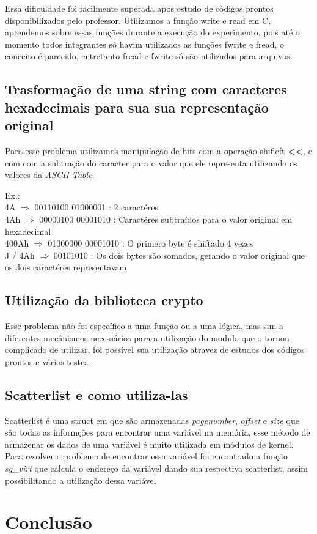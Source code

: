 Essa dificuldade foi facilmente superada após estudo de códigos prontos disponibilizados pelo professor.
Utilizamos a função write e read em C, aprendemos sobre essas funções durante a execução do experimento, pois até o momento todos integrantes só havim utilizados as funções fwrite e fread, o conceito é parecido, entretanto fread e fwrite só são utilizados para arquivos.

\subsection{Trasformação de uma string com caracteres hexadecimais para sua sua representação original}

Para esse problema utilizamos manipulação de bits com a operação shifleft \textbf{\textless\textless}, e com com a subtração do caracter para o valor que ele representa utilizando os valores da \textit{ASCII Table}.
\begin{flushleft}
\begin{em}
Ex.:\\
4A      $\Rightarrow$ 00110100 01000001 : 2 caractéres\\
4Ah     $\Rightarrow$ 00000100 00001010 : Caractéres subtraídos para o valor original em hexadecimal\\
400Ah   $\Rightarrow$ 01000000 00001010 : O primero byte é shiftado 4 vezes\\
J / 4Ah $\Rightarrow$ 00101010          : Os dois bytes são somados, gerando o valor original que os dois caractéres representavam \\ 
\end{em}
\end{flushleft}

\subsection{Utilização da biblioteca crypto}
Esse problema não foi específico a uma função ou a uma lógica, mas sim a diferentes mecânismos necessários para a utilização do modulo que o tornou complicado de utilizar, foi possível sua utilização atravez de estudos dos códigos prontos e vários testes. 

\subsection{Scatterlist e como utiliza-las}
Scatterlist é uma struct em que são armazenadas \textit{pagenumber}, \textit{offset} e \textit{size} que são todas as informções para encontrar uma variável na memória, esse método de armazenar os dados de uma variável é muito utilizada em módulos de kernel.\\
Para resolver o problema de encontrar essa variável foi encontrado a função \textit{sg\_virt} que calcula o endereço da variável dando sua respectiva scatterlist, assim possibilitando a utilização dessa variável

\section{Conclusão}


